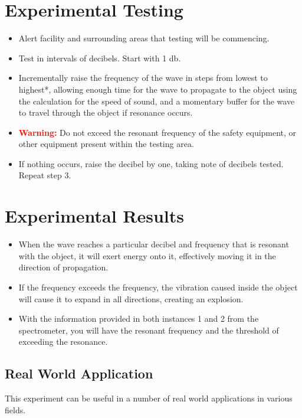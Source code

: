 \documentclass[12pt]{article}
\begin{document}
\section*{Experimental Testing}

\begin{itemize}
    \item Alert facility and surrounding areas that testing will be commencing.
    \item Test in intervals of decibels. Start with 1 db.
    \item Incrementally raise the frequency of the wave in steps from lowest to highest*, allowing enough time for the wave to propagate to the object using the calculation for the speed of sound, and a momentary buffer for the wave to travel through the object if resonance occurs.
    \item \textbf{\textcolor{red}{Warning:}} Do not exceed the resonant frequency of the safety equipment, or other equipment present within the testing area.
    \item If nothing occurs, raise the decibel by one, taking note of decibels tested. Repeat step 3.
\end{itemize}

\section*{Experimental Results}

\begin{itemize}
    \item When the wave reaches a particular decibel and frequency that is resonant with the object, it will exert energy onto it, effectively moving it in the direction of propagation.
    \item If the frequency exceeds the frequency, the vibration caused inside the object will cause it to expand in all directions, creating an explosion.
    \item With the information provided in both instances 1 and 2 from the spectrometer, you will have the resonant frequency and the threshold of exceeding the resonance.
\end{itemize}

\subsection*{Real World Application}

This experiment can be useful in a number of real world applications in various fields.
\end{document}

